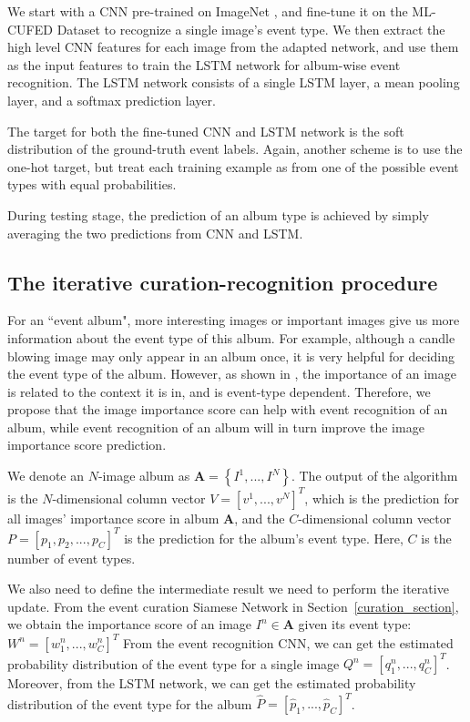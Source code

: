 \documentclass[runningheads]{llncs}
\begin{document}
We start with a CNN pre-trained on ImageNet \cite{caffe} \cite{imagenet}, and fine-tune it on the ML-CUFED Dataset to recognize a single image's event type. We then extract the high level CNN features for each image from the adapted network, and use them as the input features to train the LSTM network for album-wise event recognition. The LSTM network consists of a single LSTM layer, a mean pooling layer, and a softmax prediction layer. 


The target for both the fine-tuned CNN and LSTM network is the soft distribution of the ground-truth event labels. Again, another scheme is to use the one-hot target, but treat each training example as from one of the possible event types with equal probabilities. 
%
%
%

During testing stage, the prediction of an album type is achieved by simply averaging the two predictions from CNN and LSTM.




\subsection{The iterative curation-recognition procedure}
For an ``event album", more interesting images or important images give us more information about the event type of this album. For example, although a candle blowing image may only appear in an album once, it is very helpful for deciding the event type of the album. However, as shown in \cite{CVPR}, the importance of an image is related to the context it is in, and is event-type dependent. Therefore, we propose that the image importance score can help with event recognition of an album, while event recognition of an album will in turn improve the image importance score prediction.

We denote an $N$-image album as $\mathbf{A}= \left \{I^{1}, ..., I^{N}  \right \}$. The output of the algorithm is the $N$-dimensional column vector $V = [v^{1}, ..., v^{N}]^{T}$, which is the prediction for all images' importance score in album $\mathbf{A}$, and the $C$-dimensional column vector $P = [p_{1}, p_{2},..., p_{C}]^{T}$ is the prediction for the album's event type. Here, $C$ is the number of event types. 


We also need to define the intermediate result we need to perform the iterative update. From the event curation Siamese Network in Section~\ref{curation_section}, we obtain the importance score of an image $I^{n} \in \mathbf{A} $ given its event type: $W^{n}= \left [w_{1}^{n} , ..., w_{C}^{n}  \right ]^{T}$
From the event recognition CNN, we can get the estimated probability distribution of the event type for a single image
$Q^{n}= \left [ q_{1}^{n} , ..., q_{C}^{n}  \right ]^{T}$. Moreover, from the LSTM network, we can get the estimated probability distribution of the event type for the album $\hat{P} = [\hat{p}_{1}, ..., \hat{p}_{C}]^{T}$. 
\end{document}
